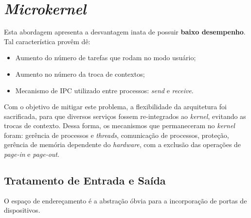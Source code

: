 \chapter{\textit{Microkernel}}


Esta abordagem apresenta a desvantagem inata de possuir \textbf{baixo desempenho}. Tal característica provêm dê:
\begin{itemize}
  \item Aumento do número de tarefas que rodam no modo usuário;
  \item Aumento no número da troca de contextos;
  \item Mecanismo de IPC utilizado entre processos: \textit{send} e \textit{receive}.
\end{itemize}

Com o objetivo de mitigar este problema, a flexibilidade da arquitetura foi sacrificada, para que diversos serviços fossem re-integrados ao \textit{kernel}, evitando as trocas de contexto. Dessa forma, os mecanismos que permaneceram no \textit{kernel} foram: gerência de processos e \textit{threads}, comunicação de processos, proteção, gerência de memória dependente do \textit{hardware}, com a exclusão das operações de \textit{page-in} e \textit{page-out}.

\section{Tratamento de Entrada e Saída}
O espaço de endereçamento é a abstração óbvia para a incorporação de portas de dispositivos.
